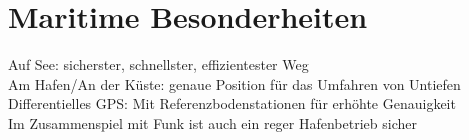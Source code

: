 \section{Maritime Besonderheiten}
\label{sec:maritim}
Auf See: sicherster, schnellster, effizientester Weg\\
Am Hafen/An der Küste: genaue Position für das Umfahren von Untiefen\\
Differentielles GPS: Mit Referenzbodenstationen für erhöhte Genauigkeit\\
Im Zusammenspiel mit Funk ist auch ein reger Hafenbetrieb sicher
